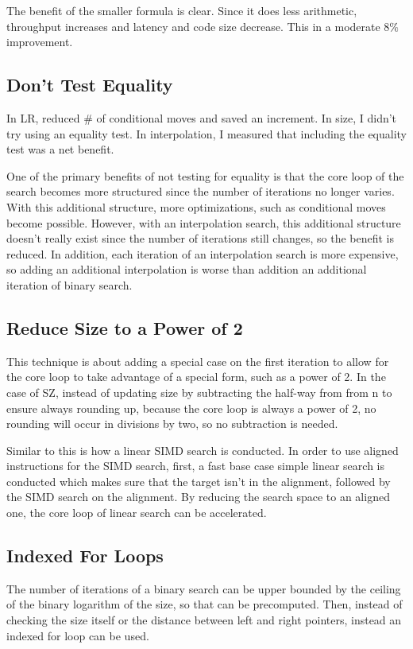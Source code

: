 \documentclass{article}
\begin{document}
The benefit of the smaller formula is clear. Since it does less arithmetic, throughput increases and latency and code size decrease. This in a moderate $8\%$ improvement.

\subsection{Don't Test Equality}
In LR, reduced \# of conditional moves and saved an increment. In size, I didn’t try using an equality test. In interpolation, I measured that including the equality test was a net benefit.

One of the primary benefits of not testing for equality is that the core loop of the search becomes more structured since the number of iterations no longer varies. With this additional structure, more optimizations, such as conditional moves become possible. However, with an interpolation search, this additional structure doesn’t really exist since the number of iterations still changes, so the benefit is reduced. In addition, each iteration of an interpolation search is more expensive, so adding an additional interpolation is worse than addition an additional iteration of binary search.

\subsection{Reduce Size to a Power of 2}
This technique is about adding a special case on the first iteration to allow for the core loop to take advantage of a special form, such as a power of 2. In the case of SZ, instead of updating size by subtracting the half-way from from n to ensure always rounding up, because the core loop is always a power of 2, no rounding will occur in divisions by two, so no subtraction is needed.

Similar to this is how a linear SIMD search is conducted. In order to use aligned instructions for the SIMD search, first, a fast base case simple linear search is conducted which makes sure that the target isn’t in the alignment, followed by the SIMD search on the alignment. By reducing the search space to an aligned one, the core loop of linear search can be accelerated.

\subsection{Indexed For Loops}
The number of iterations of a binary search can be upper bounded by the ceiling of the binary logarithm of the size, so that can be precomputed. Then, instead of checking the size itself or the distance between left and right pointers, instead an indexed for loop can be used.
\end{document}

